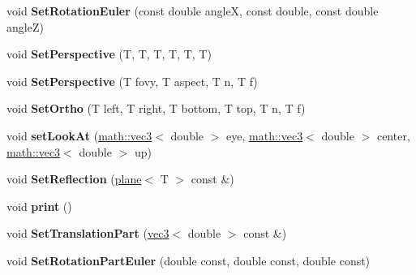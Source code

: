\begin{DoxyCompactItemize}
\item 
\hypertarget{classmath_1_1mat44_a7885a6c4037a8dc93e2f630bf419ac9a}{
void {\bfseries SetRotationEuler} (const double angleX, const double, const double angleZ)}
\label{classmath_1_1mat44_a7885a6c4037a8dc93e2f630bf419ac9a}

\item 
\hypertarget{classmath_1_1mat44_a9294493b17f600d38346d6d683ddd918}{
void {\bfseries SetPerspective} (T, T, T, T, T, T)}
\label{classmath_1_1mat44_a9294493b17f600d38346d6d683ddd918}

\item 
\hypertarget{classmath_1_1mat44_afd9ae3ec67c631724edca366a6b518cf}{
void {\bfseries SetPerspective} (T fovy, T aspect, T n, T f)}
\label{classmath_1_1mat44_afd9ae3ec67c631724edca366a6b518cf}

\item 
\hypertarget{classmath_1_1mat44_a6978c6c7b4303eb2defcbaecf24892b3}{
void {\bfseries SetOrtho} (T left, T right, T bottom, T top, T n, T f)}
\label{classmath_1_1mat44_a6978c6c7b4303eb2defcbaecf24892b3}

\item 
\hypertarget{classmath_1_1mat44_a8a983b0ba8e01e1a5461ef53fe4d98c6}{
void {\bfseries setLookAt} (\hyperlink{classmath_1_1vec3}{math::vec3}$<$ double $>$ eye, \hyperlink{classmath_1_1vec3}{math::vec3}$<$ double $>$ center, \hyperlink{classmath_1_1vec3}{math::vec3}$<$ double $>$ up)}
\label{classmath_1_1mat44_a8a983b0ba8e01e1a5461ef53fe4d98c6}

\item 
\hypertarget{classmath_1_1mat44_adac3ed3f879878f367e9d49e3ab16e05}{
void {\bfseries SetReflection} (\hyperlink{classmath_1_1plane}{plane}$<$ T $>$ const \&)}
\label{classmath_1_1mat44_adac3ed3f879878f367e9d49e3ab16e05}

\item 
\hypertarget{classmath_1_1mat44_abde01621efccb6954077023e33b4f1c0}{
void {\bfseries print} ()}
\label{classmath_1_1mat44_abde01621efccb6954077023e33b4f1c0}

\item 
\hypertarget{classmath_1_1mat44_adfefea95fc901a16a54def48636aa52d}{
void {\bfseries SetTranslationPart} (\hyperlink{classmath_1_1vec3}{vec3}$<$ double $>$ const \&)}
\label{classmath_1_1mat44_adfefea95fc901a16a54def48636aa52d}

\item 
\hypertarget{classmath_1_1mat44_a2929e412449d245d485011605bd22b84}{
void {\bfseries SetRotationPartEuler} (double const, double const, double const)}
\label{classmath_1_1mat44_a2929e412449d245d485011605bd22b84}


\end{DoxyCompactItemize}
